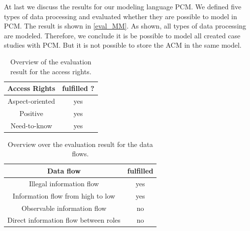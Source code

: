 At last we discuss the results for our modeling language PCM. We defined five types of data processing and evaluated whether they are possible to model in PCM. The result is shown in \autoref{eval_MM}. As shown, all types of data processing are modeled. Therefore, we conclude it is be possible to model all created case studies with PCM. But it is not possible to store the ACM in the same model. 
\begin{table}
\begin{tabular}{|c|c|}
\hline 
Access Rights & fulfilled ? \\ 
\hline 
Aspect-oriented & yes \\ 
\hline 
Positive & yes \\ 
\hline 
Need-to-know & yes \\ 
\hline 
\end{tabular} 
\caption{Overview of the evaluation result for the access rights.}
\label{eval_AR}
\end{table}

\begin{table}
\begin{tabular}{|c|c|}
\hline 
Data flow & fulfilled \\ 
\hline 
Illegal information flow & yes \\ 
\hline 
Information flow from high to low & yes \\ 
\hline 
Observable information  flow & no \\ 
\hline 
Direct information flow between roles & no \\ 
\hline 
\end{tabular} 
\caption{Overview over the evaluation result for the data flows.}
\label{eval_DF}
\end{table}
 

